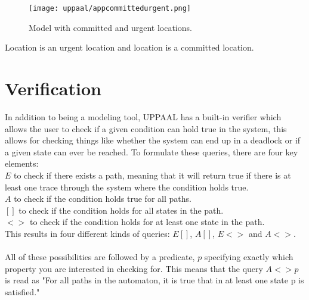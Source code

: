 \begin{figure}[H]
    \centering
    \texttt{[image: uppaal/appcommittedurgent.png]}
    \caption{Model with committed and urgent locations.}
    \label{fig:app:uppaal:committed}
\end{figure}
\noindent

Location  is an urgent location and location  is a committed location.

\section*{Verification}
In addition to being a modeling tool, UPPAAL has a built-in verifier which allows the user to check if a given condition can hold true in the system, this allows for checking things like whether the system can end up in a deadlock or if a given state can ever be reached.
To formulate these queries, there are four key elements:\\
$E$ to check if there exists a path, meaning that it will return true if there is at least one trace through the system where the condition holds true.\\
$A$ to check if the condition holds true for all paths.\\
$[]$ to check if the condition holds for all states in the path.\\
$<>$ to check if the condition holds for at least one state in the path.\\
This results in four different kinds of queries: $E[]$, $A[]$, $E<>$ and $A<>$.\\\\

All of these possibilities are followed by a predicate, $p$ specifying exactly which property you are interested in checking for.
This means that the query $A<>p$ is read as "For all paths in the automaton, it is true that in at least one state p is satisfied."
